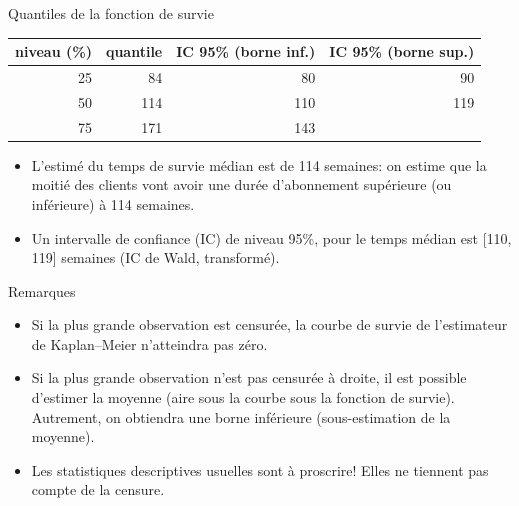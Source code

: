 \documentclass[
  ignorenonframetext,
]{beamer}
\providecommand{\tightlist}{%
  \setlength{\itemsep}{0pt}\setlength{\parskip}{0pt}}\usepackage{longtable,booktabs,array}
\begin{document}
\begin{frame}{Quantiles de la fonction de survie}
\protect\hypertarget{quantiles-de-la-fonction-de-survie}{}
\begin{table}
\centering
\begin{tabular}{rrrr}
\toprule
niveau (\%) & quantile & IC 95\% (borne inf.) & IC 95\% (borne sup.)\\
\midrule
25 & 84 & 80 & 90\\
50 & 114 & 110 & 119\\
75 & 171 & 143 & \\
\bottomrule
\end{tabular}
\end{table}

\begin{itemize}
\tightlist
\item
  L'estimé du temps de survie médian est de 114 semaines: on estime que
  la moitié des clients vont avoir une durée d'abonnement supérieure (ou
  inférieure) à 114 semaines.
\item
  Un intervalle de confiance (IC) de niveau 95\%, pour le temps médian
  est {[}110, 119{]} semaines (IC de Wald, transformé).
\end{itemize}
\end{frame}

\begin{frame}{Remarques}
\protect\hypertarget{remarques}{}
\begin{itemize}
\tightlist
\item
  Si la plus grande observation est censurée, la courbe de survie de
  l'estimateur de Kaplan--Meier n'atteindra pas zéro.
\item
  Si la plus grande observation n'est pas censurée à droite, il est
  possible d'estimer la moyenne (aire sous la courbe sous la fonction de
  survie). Autrement, on obtiendra une borne inférieure (sous-estimation
  de la moyenne).
\item
  Les statistiques descriptives usuelles sont à proscrire! Elles ne
  tiennent pas compte de la censure.
\end{itemize}
\end{frame}
\end{document}
